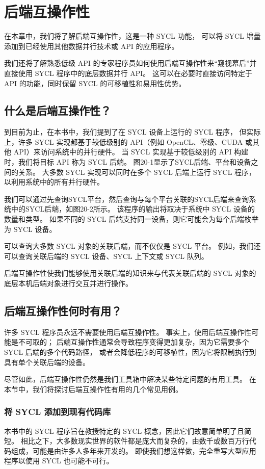 \section{后端互操作性}
在本章中，我们将了解后端互操作性，这是一种 SYCL 功能，
可以将 SYCL 增量添加到已经使用其他数据并行技术或 API 的应用程序。

我们还将了解熟悉低级 API 的专家程序员如何使用后端互操作性来“窥视幕后”并直接使用 SYCL 程序中的底层数据并行 API。 
这可以在必要时直接访问特定于 API 的功能，同时保留 SYCL 的可移植性和易用性优势。

\subsection{什么是后端互操作性？}
到目前为止，在本书中，我们提到了在 SYCL 设备上运行的 SYCL 程序，
但实际上，许多 SYCL 实现都基于较低级别的 API（例如 OpenCL、零级、CUDA 或其他 API）来访问系统中的并行硬件。 
当 SYCL 实现基于较低级别的 API 构建时，我们将目标 API 称为 SYCL 后端。 
图20-1显示了SYCL后端、平台和设备之间的关系。 
大多数 SYCL 实现可以同时在多个 SYCL 后端上运行 SYCL 程序，以利用系统中的所有并行硬件。

我们可以通过先查询SYCL平台，然后查询与每个平台关联的SYCL后端来查询系统中的SYCL后端，如图20-2所示。 
该程序的输出将取决于系统中 SYCL 设备的数量和类型。 
如果不同的 SYCL 后端支持同一设备，则它可能会为每个后端枚举为 SYCL 设备。

可以查询大多数 SYCL 对象的关联后端，而不仅仅是 SYCL 平台。 
例如，我们还可以查询关联后端的 SYCL 设备、SYCL 上下文或 SYCL 队列。

后端互操作性使我们能够使用关联后端的知识来与代表关联后端的 SYCL 对象的底层本机后端对象进行交互并进行操作。

\subsection{后端互操作性何时有用？}
许多 SYCL 程序员永远不需要使用后端互操作性。 事实上，使用后端互操作性可能是不可取的； 
后端互操作性通常会导致程序变得更加复杂，因为它需要多个 SYCL 后端的多个代码路径，
或者会降低程序的可移植性，因为它将限制执行到具有单个关联后端的设备。

尽管如此，后端互操作性仍然是我们工具箱中解决某些特定问题的有用工具。 
在本节中，我们将探讨后端互操作性有用的几个常见用例。

\subsubsection{将 SYCL 添加到现有代码库}
本书中的 SYCL 程序旨在教授特定的 SYCL 概念，因此它们故意简单明了且简短。 
相比之下，大多数现实世界的软件都是庞大而复杂的，由数千或数百万行代码组成，可能是由许多人多年来开发的。 
即使我们想这样做，完全重写大型应用程序以使用 SYCL 也可能不可行。


